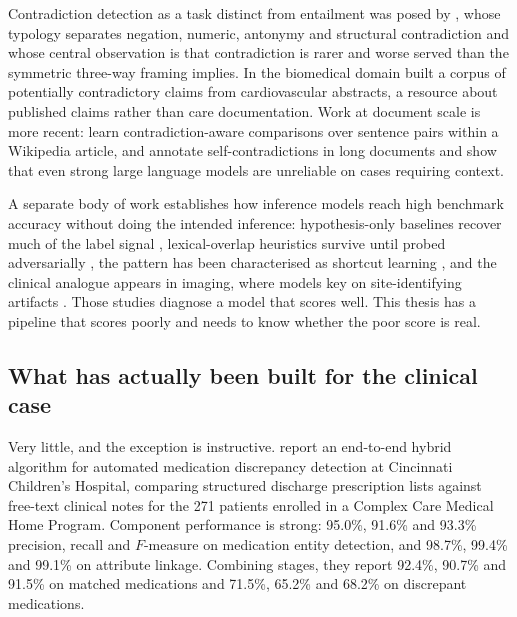 Contradiction detection as a task distinct from entailment was posed by
\citet{demarneffe2008contradictions}, whose typology separates negation, numeric, antonymy
and structural contradiction and whose central observation is that contradiction is rarer
and worse served than the symmetric three-way framing implies. In the biomedical domain
\citet{alamri2016corpus} built a corpus of potentially contradictory claims from
cardiovascular abstracts, a resource about published claims rather than care documentation.
Work at document scale is more recent: \citet{hsu2021wikicontradiction} learn
contradiction-aware comparisons over sentence pairs within a Wikipedia article, and
\citet{li2024contradoc} annotate self-contradictions in long documents and show that even
strong large language models are unreliable on cases requiring context.

A separate body of work establishes how inference models reach high benchmark accuracy
without doing the intended inference: hypothesis-only baselines recover much of the label
signal \citep{poliak2018hypothesis,gururangan2018artifacts}, lexical-overlap heuristics
survive until probed adversarially \citep{mccoy2019hans}, the pattern has been characterised
as shortcut learning \citep{geirhos2020shortcut}, and the clinical analogue appears in
imaging, where models key on site-identifying artifacts \citep{zech2018generalization}. Those
studies diagnose a model that scores well. This thesis has a pipeline that scores poorly and
needs to know whether the poor score is real.

\subsection{What has actually been built for the clinical case}

Very little, and the exception is instructive. \citet{li2015discrepancy} report an end-to-end
hybrid algorithm for automated medication discrepancy detection at Cincinnati Children's
Hospital, comparing structured discharge prescription lists against free-text clinical notes
for the 271 patients enrolled in a Complex Care Medical Home Program. Component performance
is strong: 95.0\%, 91.6\% and 93.3\% precision, recall and $F$-measure on medication entity
detection, and 98.7\%, 99.4\% and 99.1\% on attribute linkage. Combining stages, they report
92.4\%, 90.7\% and 91.5\% on matched medications and 71.5\%, 65.2\% and 68.2\% on discrepant
medications.

